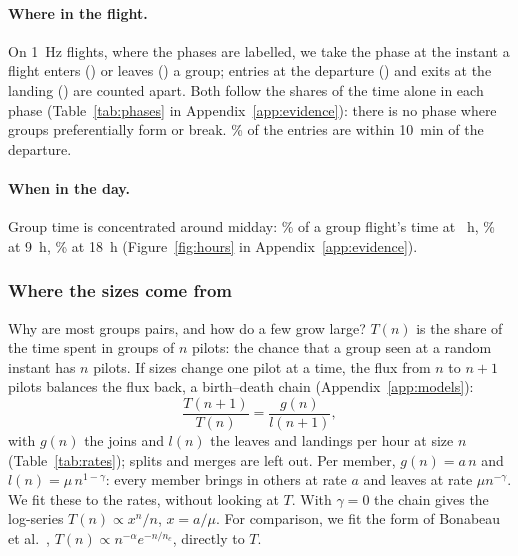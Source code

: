 \begin{table}
\centering
\footnotesize

\caption{By size: hours spent, median duration of a group, and groups ending per hour by
outcome, with 5--95\% bands.}
\label{tab:rates}
\end{table}

\paragraph{Where in the flight.}\label{sec:phases} On 1~Hz flights, where the phases are labelled,
we take the phase at the instant a flight enters (\Entries{}) or leaves (\Exits{}) a group; entries
at the departure (\AtDeparture{}) and exits at the landing (\AtLanding{}) are counted apart. Both
follow the shares of the time alone in each phase (Table~\ref{tab:phases} in
Appendix~\ref{app:evidence}): there is no phase where groups preferentially form or break.
\EntriesEarly\% of the entries are within 10~min of the departure.

\paragraph{When in the day.}\label{sec:hours} Group time is concentrated around midday:
\GroupShareNoon\% of a group flight's time at \GroupShareNoonHour~h, \GroupShareMorning\% at 9~h,
\GroupShareEvening\% at 18~h (Figure~\ref{fig:hours} in Appendix~\ref{app:evidence}).

\subsubsection{Where the sizes come from}\label{sec:fission}

Why are most groups pairs, and how do a few grow large? $T(n)$ is the share of the time spent in
groups of $n$ pilots: the chance that a group seen at a random instant has $n$ pilots. If
sizes change one pilot at a time, the flux from $n$ to $n+1$ pilots balances the flux back, a
birth--death chain (Appendix~\ref{app:models}):
\begin{equation}\label{eq:chain}
  \frac{T(n+1)}{T(n)}=\frac{g(n)}{l(n+1)},
\end{equation}
with $g(n)$ the joins and $l(n)$ the leaves and landings per hour at size $n$
(Table~\ref{tab:rates}); splits and merges are left out. Per member, $g(n)=a\,n$ and
$l(n)=\mu\,n^{1-\gamma}$: every member brings in others at rate $a$ and leaves at rate
$\mu n^{-\gamma}$. We fit these to the rates, without looking at $T$. With $\gamma=0$ the chain
gives the log-series $T(n)\propto x^n/n$, $x=a/\mu$. For comparison, we fit the form of Bonabeau
et al.~\cite{bonabeau1999}, $T(n)\propto n^{-\alpha}e^{-n/n_c}$, directly to $T$.

